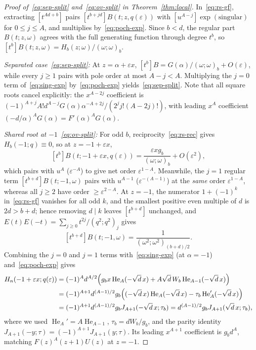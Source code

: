 \documentclass[11pt,reqno]{amsart}
\numberwithin{equation}{section}
\theoremstyle{definition}
\theoremstyle{remark}
\newcommand{\He}{\operatorname{He}}
\newcommand{\eps}{\varepsilon}
\newcommand{\poch}[3]{(#1;#2)_{#3}}
\begin{document}
\begin{proof}[Proof of~\eqref{eq:sep-split} and~\eqref{eq:ov-split} in Theorem~\ref{thm:local}]
In~\eqref{eq:rs-gf}, extracting $[t^{Ad+b}]$ pairs $[t^{b+jd}]B(t;z,q(\eps))$ with $[u^{A-j}]\exp(\text{singular})$ for $0\le j\le A$, and multiplies by~\eqref{eq:poch-exp}. Since $b<d$, the regular part $B(t;z,\omega)$ agrees with the full generating function through degree $t^b$, so $[t^b]B(t;z,\omega)=H_b(z;\omega)/\poch{\omega}{\omega}{b}$.

\smallskip
\noindent\emph{Separated case~\eqref{eq:sep-split}:} At $z=\alpha+\eps x$, $[t^b]B = G(\alpha)/\poch{\omega}{\omega}{b}+O(\eps)$, while every $j\ge 1$ pairs with pole order at most $A-j<A$. Multiplying the $j=0$ term of~\eqref{eq:sing-exp} by~\eqref{eq:poch-exp} yields~\eqref{eq:sep-split}. Note that all square roots cancel explicitly: the $x^{A-2j}$ coefficient is $(-1)^{A+j}A!d^{A-j}G(\alpha)\alpha^{-A+2j}/(2^j j!(A-2j)!)$, with leading $x^A$ coefficient $(-d/\alpha)^A G(\alpha) = F'(\alpha)^A G(\alpha)$.

\smallskip
\noindent\emph{Shared root at $-1$~\eqref{eq:ov-split}:} For odd $b$, reciprocity~\eqref{eq:rs-rec} gives $H_b(-1;q)\equiv 0$, so at $z=-1+\eps x$,
\[
[t^b]B(t;-1+\eps x, q(\eps)) = \frac{\eps x g_b}{\poch{\omega}{\omega}{b}} + O(\eps^2),
\]
which pairs with $u^A$ ($\eps^{-A}$) to give net order $\eps^{1-A}$. Meanwhile, the $j=1$ regular term $[t^{b+d}]B(t;-1,\omega)$ pairs with $u^{A-1}$ ($\eps^{-(A-1)}$) at the \emph{same} order $\eps^{1-A}$, whereas all $j\ge 2$ have order $\ge \eps^{2-A}$. At $z=-1$, the numerator $1+(-1)^k$ in~\eqref{eq:rs-gf} vanishes for all odd $k$, and the smallest positive even multiple of $d$ is $2d > b+d$; hence removing $d\mid k$ leaves $[t^{b+d}]$ unchanged, and $E(t)E(-t)=\sum_{j\ge 0} t^{2j}/\poch{q^2}{q^2}{j}$ gives
\[
[t^{b+d}]B(t;-1,\omega) = \frac{1}{\poch{\omega^2}{\omega^2}{(b+d)/2}}.
\]
Combining the $j=0$ and $j=1$ terms with~\eqref{eq:sing-exp} (at $\alpha=-1$) and~\eqref{eq:poch-exp} gives
\begin{align*}
[\eps^{A+1}] H_n(-1+\eps x; q(\eps))
&= (-1)^A d^{A/2}\Bigl(g_b x \He_A(-\sqrt{d}\,x) + A\sqrt{d}\,W_b\He_{A-1}(-\sqrt{d}\,x)\Bigr)\\
&= (-1)^{A+1} d^{(A-1)/2} g_b \Bigl((-\sqrt{d}\,x)\He_A(-\sqrt{d}\,x) - \tau_b \He_A'(-\sqrt{d}\,x)\Bigr)\\
&= (-1)^{A+1} d^{(A-1)/2} g_b J_{A+1}(-\sqrt{d}\,x;\tau_b) = d^{(A-1)/2} g_b J_{A+1}(\sqrt{d}\,x;\tau_b),
\end{align*}
where we used $\He_A'=A\He_{A-1}$, $\tau_b=dW_b/g_b$, and the parity identity $J_{A+1}(-y;\tau)=(-1)^{A+1}J_{A+1}(y;\tau)$. Its leading $x^{A+1}$ coefficient is $g_b d^A$, matching $F(z)^A(z+1)U(z)$ at $z=-1$.
\end{proof}
\end{document}
